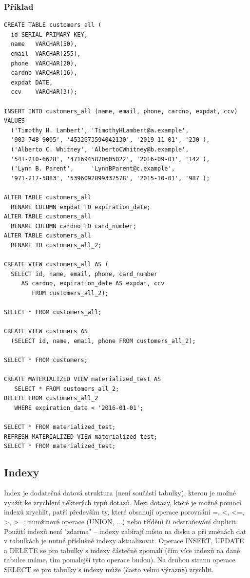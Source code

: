 \documentclass[10pt,a4paper]{article}
\begin{document}
\subsubsection{Příklad}
\begin{lstlisting}
CREATE TABLE customers_all (
  id SERIAL PRIMARY KEY,
  name   VARCHAR(50),
  email  VARCHAR(255),
  phone  VARCHAR(20),
  cardno VARCHAR(16),
  expdat DATE,
  ccv	 VARCHAR(3));
  
INSERT INTO customers_all (name, email, phone, cardno, expdat, ccv) VALUES
  ('Timothy H. Lambert', 'TimothyHLambert@a.example', 
  '903-748-9005', '4532673594042130', '2019-11-01', '230'),
  ('Alberto C. Whitney', 'AlbertoCWhitney@b.example', 
  '541-210-6628', '4716945870605022', '2016-09-01', '142'),
  ('Lynn B. Parent',     'LynnBParent@c.example',     
  '971-217-5883', '5396092899337578', '2015-10-01', '987');
  
ALTER TABLE customers_all 
  RENAME COLUMN expdat TO expiration_date;
ALTER TABLE customers_all 
  RENAME COLUMN cardno TO card_number;
ALTER TABLE customers_all 
  RENAME TO customers_all_2;
  
CREATE VIEW customers_all AS (
  SELECT id, name, email, phone, card_number 
     AS cardno, expiration_date AS expdat, ccv 
        FROM customers_all_2);

SELECT * FROM customers_all;

CREATE VIEW customers AS 
  (SELECT id, name, email, phone FROM customers_all_2);

SELECT * FROM customers;

CREATE MATERIALIZED VIEW materialized_test AS 
   SELECT * FROM customers_all_2;
DELETE FROM customers_all_2 
   WHERE expiration_date < '2016-01-01';

SELECT * FROM materialized_test;
REFRESH MATERIALIZED VIEW materialized_test;
SELECT * FROM materialized_test;
\end{lstlisting}

\subsection{Indexy}
Index je dodatečná datová struktura (není součástí tabulky), kterou je možné využít ke zrychlení některých typů dotazů. Mezi dotazy, které je možné pomocí indexů zrychlit, patří především ty, které obsahují operace porovnání =, <, <=, >, >=; množinové operace (UNION, ...) nebo třídění či odstraňování duplicit.
Použití indexů není "zdarma" – indexy zabírají místo na disku a při změnách dat v tabulkách je nutné příslušné indexy aktualizovat. Operace INSERT, UPDATE a DELETE se pro tabulky s indexy částečně zpomalí (čím více indexů na dané tabulce máme, tím pomalejší tyto operace budou). Na druhou stranu operace SELECT se pro tabulky s indexy může (často velmi výrazně) zrychlit.
\end{document}
